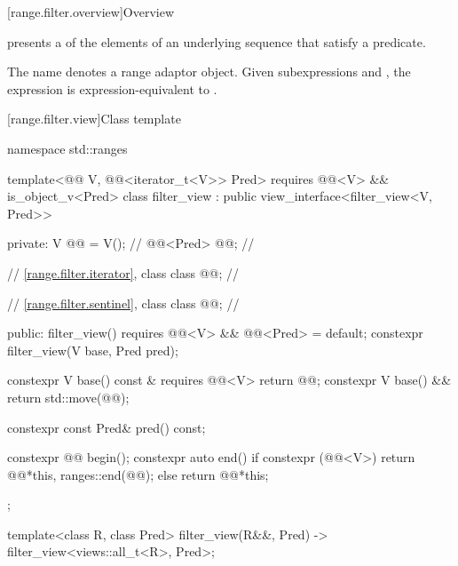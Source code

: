 [range.filter.overview]{Overview}

\pnum
{} presents a  of the elements
of an underlying sequence that satisfy a predicate.

\pnum
{}%
The name  denotes a
range adaptor object.
Given subexpressions  and ,
the expression  is expression-equivalent to
.

\pnum
\begin{example}
\end{example}

[range.filter.view]{Class template }

%
%
%
\begin{codeblock}
namespace std::ranges {
  template<@@ V, @@<iterator_t<V>> Pred>
    requires @@<V> && is_object_v<Pred>
  class filter_view : public view_interface<filter_view<V, Pred>> {
  private:
    V @@ = V();                              // \expos
    @@<Pred> @@;                    // \expos

    // \ref{range.filter.iterator}, class 
    class @@;                             // \expos

    // \ref{range.filter.sentinel}, class 
    class @@;                             // \expos

  public:
    filter_view() requires @@<V> && @@<Pred> = default;
    constexpr filter_view(V base, Pred pred);

    constexpr V base() const & requires @@<V> { return @@; }
    constexpr V base() && { return std::move(@@); }

    constexpr const Pred& pred() const;

    constexpr @@ begin();
    constexpr auto end() {
      if constexpr (@@<V>)
        return @@{*this, ranges::end(@@)};
      else
        return @@{*this};
    }
  };

  template<class R, class Pred>
    filter_view(R&&, Pred) -> filter_view<views::all_t<R>, Pred>;
}
\end{codeblock}

